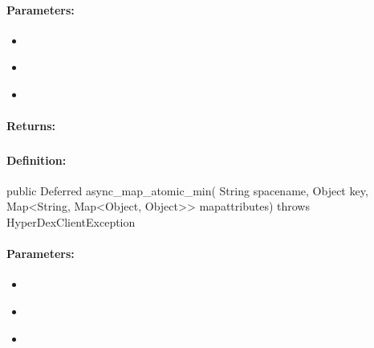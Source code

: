 \paragraph{Parameters:}
\begin{itemize}[noitemsep]
\item {}\\

\item {}\\

\item {}\\

\end{itemize}

\paragraph{Returns:}


\pagebreak
\subsubsection{}
\label{api:java:async_map_atomic_min}


\paragraph{Definition:}
\begin{javacode}
public Deferred async_map_atomic_min(
        String spacename,
        Object key,
        Map<String, Map<Object, Object>> mapattributes) throws HyperDexClientException
\end{javacode}

\paragraph{Parameters:}
\begin{itemize}[noitemsep]
\item {}\\

\item {}\\

\item {}\\

\end{itemize}

